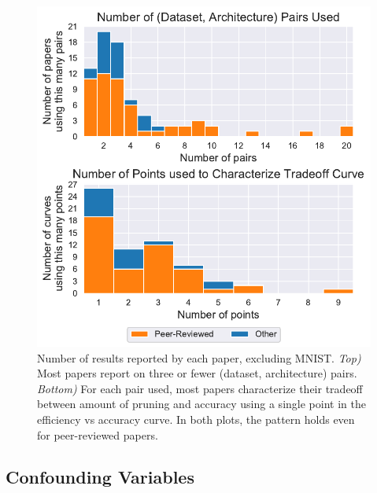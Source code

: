\begin{figure}[h]
\begin{center}
\includegraphics[width=\linewidth]{numresults_stats}
\caption{Number of results reported by each paper, excluding MNIST. \textit{Top)} Most papers report on three or fewer (dataset, architecture) pairs. \textit{Bottom)} For each pair used, most papers characterize their tradeoff between amount of pruning and accuracy using a single point in the efficiency vs accuracy curve. In both plots, the pattern holds even for peer-reviewed papers.}
\label{fig:numresults_stats}
\end{center}
\end{figure}

\subsection{Confounding Variables} \label{sec:confounding}

